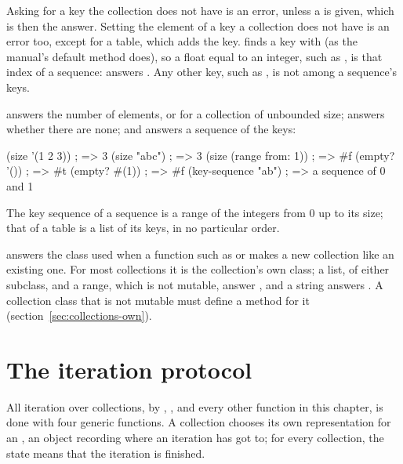 \noindent Asking for a key the collection does not have is an error,
unless a  is given, which is then the answer. Setting the
element of a key a collection does not have is an error too, except for
a table, which adds the key.  finds a key with \code{=}
(as the manual's default method does), so a float equal to an integer,
such as , is that index of a sequence:
 answers . Any other key, such as
, is not among a sequence's keys.

 answers the number of elements, or  for a
collection of unbounded size;  answers whether there are
none; and  answers a sequence of the keys:

\begin{dylan}
(size '(1 2 3))           ; => 3
(size "abc")              ; => 3
(size (range from: 1))    ; => #f
(empty? '())              ; => #t
(empty? #(1))             ; => #f
(key-sequence "ab")       ; => a sequence of 0 and 1
\end{dylan}

\noindent The key sequence of a sequence is a range of the integers from 0
up to its size; that of a table is a list of its keys, in no particular
order.

 answers the class used when a function such as
 or  makes a new collection like an existing
one. For most collections it is the collection's own class; a list,
of either subclass, and a range, which is not mutable, answer
, and a string answers . A collection class that is not mutable must define
a method for it (section~\ref{sec:collections-own}).

\section{The iteration protocol}\label{sec:collections-iteration}

All iteration over collections, by , ,
 and every other function in this chapter, is done with
four generic functions. A collection chooses its own representation for
an , an object recording where an iteration has
got to; for every collection, the state  means that the
iteration is finished.

